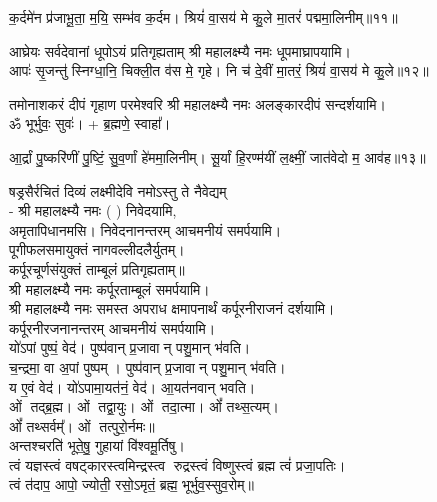 \begin{center}

क॒र्दमे॑न प्र॑जाभू॒ता॒ म॒यि॒ सम्भ॑व क॒र्दम।
श्रियं॑ वा॒सय॑ मे कु॒ले मा॒तरं॑ पद्ममा॒लिनीम्॥११॥

{आघ्रेयः सर्वदेवानां धूपोऽयं प्रतिगृह्यताम्}
श्री महालक्ष्म्यै नमः धूपमाघ्रापयामि।\\

आपः॑ सृ॒जन्तु॑ स्निग्धा॒नि॒ चिक्ली॒त व॑स मे॒ गृहे।
नि च॑ दे॒वीं मा॒तरं॒ श्रियं॑ वा॒सय॑ मे कु॒ले॥१२॥

{तमोनाशकरं दीपं गृहाण परमेश्वरि}
श्री महालक्ष्म्यै नमः अलङ्कारदीपं सन्दर्शयामि।\\


ॐ भूर्भुवः॒ सुवः॑। + ब्र॒ह्मणे॒ स्वाहा᳚।

आ॒र्द्रां पु॒ष्करि॑णीं पु॒ष्टिं॒ सु॒व॒र्णां हे॑ममा॒लिनीम्।
सू॒र्यां हि॒रण्म॑यीं ल॒क्ष्मीं॒ जात॑वेदो म॒ आव॑ह॥१३॥

{षड्रसैर्रचितं दिव्यं लक्ष्मीदेवि नमोऽस्तु ते}
नैवेद्यम्\\
- श्री महालक्ष्म्यै नमः (	) निवेदयामि, \\
अमृतापिधानमसि। निवेदनानन्तरम् आचमनीयं समर्पयामि।\\

पूगीफलसमायुक्तं नागवल्लीदलैर्युतम्।\\
कर्पूरचूर्णसंयुक्तं ताम्बूलं प्रतिगृह्यताम्॥\\
श्री महालक्ष्म्यै नमः कर्पूरताम्बूलं समर्पयामि।\\

श्री महालक्ष्म्यै नमः समस्त अपराध क्षमापनार्थं कर्पूरनीराजनं दर्शयामि।\\
कर्पूरनीरजनानन्तरम् आचमनीयं समर्पयामि।\\

 यो॑ऽपां पुष्पं॒ वेद॑। पुष्प॑वान् प्र॒जावान् पशु॒मान् भ॑वति।\\
च॒न्द्रमा॒ वा अ॒पां पुष्पम्। पुष्प॑वान् प्र॒जावान् पशु॒मान् भ॑वति।\\
य ए॒वं वेद॑। यो॑ऽपामा॒यत॑नं॒ वेद॑। आ॒यत॑नवान् भवति।\\

ओं तद्ब्र॒ह्म। ओं तद्वा॒युः। ओं तदा॒त्मा। ओं᳚ तथ्स॒त्यम्‌।\\
ओं᳚ तथ्सर्वम्᳚‌। ओं तत्पुरो॒र्नमः॥\\

अन्तश्चरति॑ भूते॒षु॒ गुहायां वि॑श्वमू॒र्तिषु। \\
त्वं यज्ञस्त्वं वषट्कारस्त्वमिन्द्रस्त्व रुद्रस्त्वं विष्णुस्त्वं ब्रह्म त्वं॑ प्रजा॒पतिः। \\
त्वं त॑दाप॒ आपो॒ ज्योती॒ रसो॒ऽमृतं॒ ब्रह्म॒ भूर्भुव॒स्सुव॒रोम्‌॥\\


\end{center}
